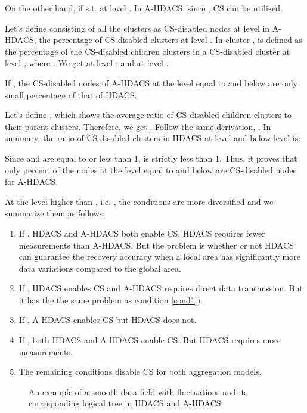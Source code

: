 \documentclass[conference]{IEEEtran}
\begin{document}
On the other hand, if  s.t.  at level 
. In A-HDACS, since ,  CS can be utilized. 

Let's define  consisting of all the clusters as CS-disabled nodes at level  in A-HDACS, 
  the percentage of CS-disabled clusters at level . In cluster 
 ,  is defined as the percentage of the CS-disabled children clusters in a CS-disabled 
cluster at level , where . We get  at level ; and 
 at level . 

\begin{prop}\label{prop2}
 If , the CS-disabled nodes of A-HDACS at the level equal to and below 
  are only small percentage of that of HDACS. 
\end{prop}
\begin{IEEEproof}
Let's define , 
which shows the average ratio of CS-disabled children clusters to their 
parent clusters. Therefore, we get . 
Follow the same derivation, . In summary, the ratio of CS-disabled 
clusters in HDACS at level  and below level  is:

Since  and  are equal to or less than 1,  is strictly less than 1. 
Thus, it proves that only  percent of the nodes at the level equal to and below 
  are CS-disabled nodes for A-HDACS.
\end{IEEEproof}

At the level higher than , i.e. , the conditions are more diversified and we summarize 
them as follows:
  \begin{enumerate}
    \item If , HDACS and 
    A-HDACS both enable CS. HDACS requires fewer measurements than A-HDACS. 
    But the problem is whether or not HDACS can guarantee the 
    recovery accuracy when a local area has significantly more data variations compared to the global 
    area. \label{cond1}
    \item If , HDACS 
    enables CS and A-HDACS requires direct data transmission. But it has the 
    the same problem as condition \ref{cond1}). 
    \item If , A-HDACS 
    enables CS but HDACS does not. 
    \item If , both HDACS 
    and A-HDACS enable CS. But HDACS requires more measurements.
    \item The remaining conditions disable CS for both aggregation models. 
  \end{enumerate}  

\begin{figure*}
\centering 
{}
\qquad
{}
\qquad
{}
\caption{An example of a smooth data field with fluctuations and its corresponding logical tree in HDACS and A-HDACS}
\end{figure*}
\end{document}
